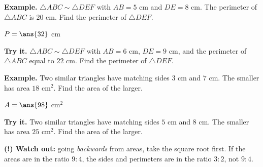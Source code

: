 \documentclass[12pt]{article}
\begin{document}
\begin{examplebox}
\textbf{Example.} $\triangle ABC \sim \triangle DEF$ with $AB = 5$ cm and
$DE = 8$ cm. The perimeter of $\triangle ABC$ is $20$ cm. Find the perimeter of
$\triangle DEF$.

$P = \ans{32}$ cm
\end{examplebox}

\begin{tryitbox}
\textbf{Try it.} $\triangle ABC \sim \triangle DEF$ with $AB = 6$ cm,
$DE = 9$ cm, and the perimeter of $\triangle ABC$ equal to $22$ cm. Find the
perimeter of $\triangle DEF$.\\[2pt]
\end{tryitbox}


\begin{examplebox}
\textbf{Example.} Two similar triangles have matching sides $3$ cm and $7$ cm.
The smaller has area $18$ cm$^2$. Find the area of the larger.

$A = \ans{98}$ cm$^2$
\end{examplebox}

\begin{tryitbox}
\textbf{Try it.} Two similar triangles have matching sides $5$ cm and $8$ cm.
The smaller has area $25$ cm$^2$. Find the area of the larger.\\[2pt]
\end{tryitbox}

\begin{watchoutbox}
\textbf{(!) Watch out:} going \emph{backwards} from areas, take the square root
first. If the areas are in the ratio $9:4$, the sides and perimeters are in the
ratio $3:2$, not $9:4$.
\end{watchoutbox}
\end{document}

